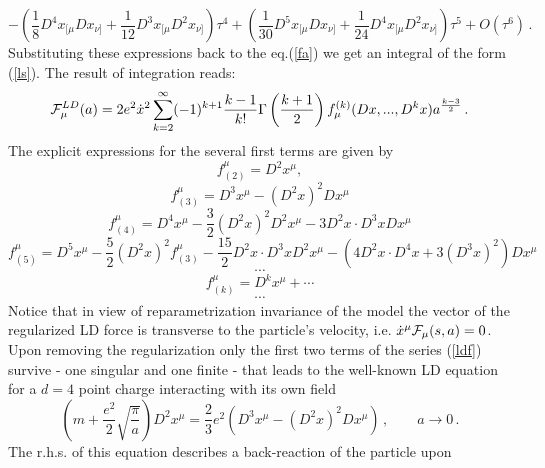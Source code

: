 \documentclass[a4paper,12pt]{article}
\begin{document}
\begin{equation*}
-\left( \frac 18D^4x_{[\mu }Dx_{\nu ]}+\frac 1{12}D^3x_{[\mu }D^2x_{\nu
]}\right) \tau ^4+\left( \frac 1{30}D^5x_{[\mu }Dx_{\nu ]}+\frac
1{24}D^4x_{[\mu }D^2x_{\nu ]}\right) \tau ^5+O(\tau ^6)\,.
\end{equation*}
Substituting these expressions back to the eq.(\ref{fa}) we get an integral
of the form (\ref{ls}). The result of integration reads:
\begin{equation}
{\cal F}_\mu ^{LD}(a)=2e^2\dot x^2\sum_{k=2}^\infty (-1)^{k+1}\frac{k-1}{k!}%
\Gamma \left( \frac{k+1}2\right) f_\mu ^{(k)}(Dx,...,D^kx)a^{\frac{k-3}2}\,.
\label{ldf}
\end{equation}
The explicit expressions for the several first terms are given by
\begin{equation*}
f_{(2)}^\mu =D^2x^\mu ,
\end{equation*}
\begin{equation*}
f_{(3)}^\mu =D^3x^\mu -(D^2x)^2Dx^\mu
\end{equation*}
\begin{equation*}
f_{(4)}^\mu =D^4x^\mu -\frac 32(D^2x)^2D^2x^\mu -3D^2x\cdot D^3xDx^\mu
\end{equation*}
\begin{equation*}
f_{(5)}^\mu =D^5x^\mu -\frac 52(D^2x)^2f_{(3)}^\mu -\frac{15}2D^2x\cdot
D^3xD^2x^\mu -(4D^2x\cdot D^4x+3(D^3x)^2)Dx^\mu
\end{equation*}
\begin{equation*}
\cdots
\end{equation*}
\begin{equation*}
f_{(k)}^\mu =D^kx^\mu +\cdots
\end{equation*}
\begin{equation*}
\cdots
\end{equation*}
Notice that in view of reparametrization invariance of the model the vector
of the regularized LD force is transverse to the particle's velocity, i.e. $%
\dot x^\mu {\cal F}_\mu (s,a)=0$. Upon removing the regularization only the
first two terms of the series (\ref{ldf}) survive - one singular and one
finite - that leads to the well-known LD equation for a $d=4$ point charge
interacting with its own field
\begin{equation}
\left( m+\frac{e^2}2\sqrt{\frac \pi a}\right) D^2x^\mu =\frac 23e^2(D^3x^\mu
-(D^2x)^2Dx^\mu )\,,\qquad a\rightarrow 0\,.  \label{ld4}
\end{equation}
The r.h.s. of this equation describes a back-reaction of the particle upon
\end{document}

